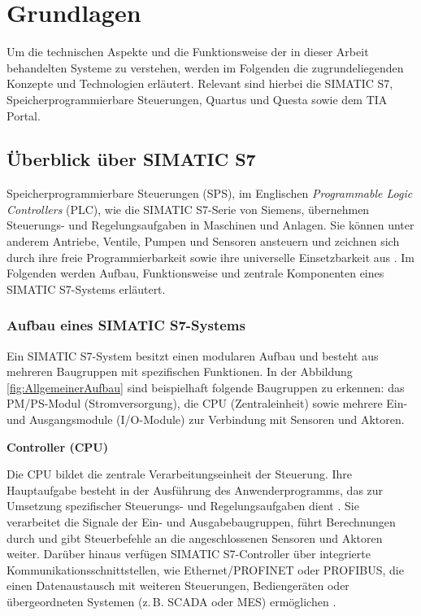 \chapter{Grundlagen} 
\label{chap:grundlagen}
Um die technischen Aspekte und die Funktionsweise der in dieser Arbeit behandelten Systeme
zu verstehen, werden im Folgenden die zugrundeliegenden Konzepte und Technologien erläutert. 
Relevant sind hierbei die SIMATIC S7, Speicherprogrammierbare Steuerungen, Quartus und Questa sowie dem
TIA Portal.

\section{Überblick über SIMATIC S7}

Speicherprogrammierbare Steuerungen (SPS), im Englischen \textit{Programmable Logic Controllers} (PLC), wie die SIMATIC S7-Serie von Siemens, übernehmen Steuerungs- und Regelungsaufgaben in Maschinen und Anlagen. Sie können unter anderem Antriebe, Ventile, Pumpen und Sensoren ansteuern und zeichnen sich durch ihre freie Programmierbarkeit sowie ihre universelle Einsetzbarkeit aus \cite{babel2024}. Im Folgenden werden Aufbau, Funktionsweise und zentrale Komponenten eines SIMATIC S7-Systems erläutert.

\subsection{Aufbau eines SIMATIC S7-Systems}

Ein SIMATIC S7-System besitzt einen modularen Aufbau und besteht aus mehreren Baugruppen mit spezifischen Funktionen. In der Abbildung \ref{fig:AllgemeinerAufbau} sind beispielhaft folgende Baugruppen zu erkennen: das PM/PS-Modul (Stromversorgung), die CPU (Zentraleinheit) sowie mehrere Ein- und Ausgangsmodule (I/O-Module) zur Verbindung mit Sensoren und Aktoren.

\textbf{Controller (CPU)}  

Die CPU bildet die zentrale Verarbeitungseinheit der Steuerung. Ihre Hauptaufgabe besteht in der Ausführung des Anwenderprogramms, das zur Umsetzung spezifischer Steuerungs- und Regelungsaufgaben dient \cite{babel2024}. Sie verarbeitet die Signale der Ein- und Ausgabebaugruppen, führt Berechnungen durch und gibt Steuerbefehle an die angeschlossenen Sensoren und Aktoren weiter.  
Darüber hinaus verfügen SIMATIC S7-Controller über integrierte Kommunikationsschnittstellen, wie Ethernet/PROFINET oder PROFIBUS, die einen Datenaustausch mit weiteren Steuerungen, Bediengeräten oder übergeordneten Systemen (z.\,B. SCADA oder MES) ermöglichen \cite{stephan_prozesstechnik_i}.


